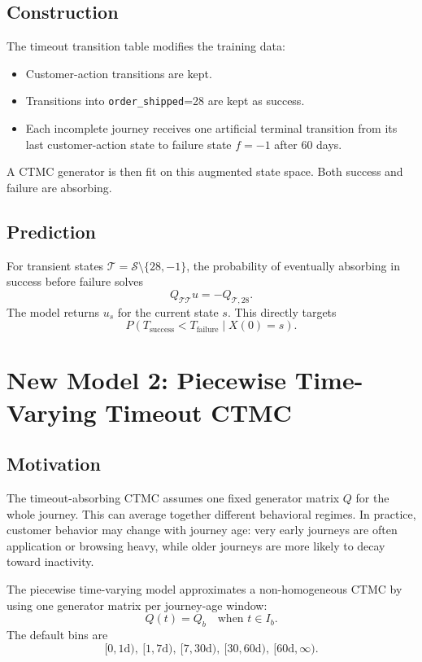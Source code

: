 \documentclass[11pt]{article}
\begin{document}
\subsection{Construction}

The timeout transition table modifies the training data:

\begin{itemize}
    \item Customer-action transitions are kept.
    \item Transitions into \texttt{order\_shipped}=28 are kept as success.
    \item Each incomplete journey receives one artificial terminal transition
          from its last customer-action state to failure state $f=-1$ after
          60 days.
\end{itemize}

A CTMC generator is then fit on this augmented state space. Both success and
failure are absorbing.

\subsection{Prediction}

For transient states $\mathcal{T} = \mathcal{S}\setminus\{28,-1\}$, the
probability of eventually absorbing in success before failure solves
\[
    Q_{\mathcal{T}\mathcal{T}}u
    =
    -Q_{\mathcal{T},28}.
\]
The model returns $u_s$ for the current state $s$. This directly targets
\[
    P(T_{\text{success}} < T_{\text{failure}} \mid X(0)=s).
\]

\section{New Model 2: Piecewise Time-Varying Timeout CTMC}

\subsection{Motivation}

The timeout-absorbing CTMC assumes one fixed generator matrix $Q$ for the whole
journey. This can average together different behavioral regimes. In practice,
customer behavior may change with journey age: very early journeys are often
application or browsing heavy, while older journeys are more likely to decay
toward inactivity.

The piecewise time-varying model approximates a non-homogeneous CTMC by using
one generator matrix per journey-age window:
\[
    Q(t)=Q_b
    \quad \text{when } t \in I_b .
\]
The default bins are
\[
    [0,1\text{d}),\ [1,7\text{d}),\ [7,30\text{d}),\
    [30,60\text{d}),\ [60\text{d},\infty).
\]
\end{document}
